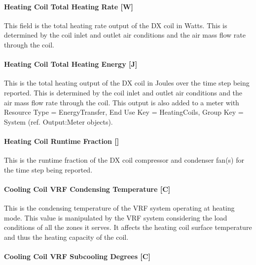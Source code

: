 \paragraph{Heating Coil Total Heating Rate {[}W{]}}\label{heating-coil-total-heating-rate-w-1}

This field is the total heating rate output of the DX coil in Watts. This is determined by the coil inlet and outlet air conditions and the air mass flow rate through the coil.

\paragraph{Heating Coil Total Heating Energy {[}J{]}}\label{heating-coil-total-heating-energy-j-1}

This is the total heating output of the DX coil in Joules over the time step being reported. This is determined by the coil inlet and outlet air conditions and the air mass flow rate through the coil. This output is also added to a meter with Resource Type = EnergyTransfer, End Use Key = HeatingCoils, Group Key = System (ref. Output:Meter objects).

\paragraph{\texorpdfstring{Heating Coil Runtime Fraction {[]}}{Heating Coil Runtime Fraction }}\label{heating-coil-runtime-fraction-2}

This is the runtime fraction of the DX coil compressor and condenser fan(s) for the time step being reported.

\paragraph{Cooling Coil VRF Condensing Temperature {[}C{]}}\label{cooling-coil-vrf-condensing-temperature-c}

This is the condensing temperature of the VRF system operating at heating mode. This value is manipulated by the VRF system considering the load conditions of all the zones it serves. It affects the heating coil surface temperature and thus the heating capacity of the coil.

\paragraph{Cooling Coil VRF Subcooling Degrees {[}C{]}}\label{cooling-coil-vrf-subcooling-degrees-c}

